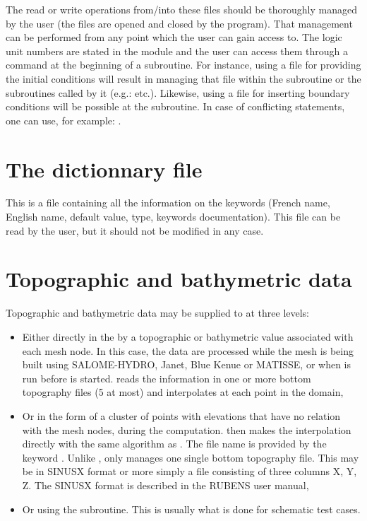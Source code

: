 The read or write operations from/into these files should be thoroughly managed
by the user (the files are opened and closed by the program). That management
can be performed from any point which the user can gain access to.
The logic unit numbers are stated in the 
module and the user can access them through a
 command at the beginning of a
subroutine. For instance, using a file for providing the initial conditions
will result in managing that file within the  subroutine
or the subroutines called by it (e.g.:  etc.).
Likewise, using a file for inserting boundary conditions will be possible at
the  subroutine.
In case of conflicting statements, one can use,
for example: .

\section{The dictionnary file}

This is a file containing all the information on the keywords (French name,
English name, default value, type, keywords documentation). This file can be
read by the user, but it should not be modified in any case.

\section{Topographic and bathymetric data}
\label{sec:topo}
Topographic and bathymetric data may be supplied to  at three
levels:

\begin{itemize}
\item Either directly in the  by a topographic
or bathymetric value associated with each mesh node.
In this case, the data are processed while the mesh is being built using
SALOME-HYDRO, Janet, Blue Kenue or MATISSE,
or when \stbtel is run before  is started.
\stbtel reads the information in one or more bottom topography files (5 at most)
and interpolates at each point in the domain,

\item Or in the form of a cluster of points with elevations that have
no relation with the mesh nodes, during the  computation.
 then makes the interpolation directly with the same algorithm as
\stbtel.
The file name is provided by the keyword .
Unlike \stbtel,  only manages one single bottom topography file.
This may be in SINUSX format or more simply a file consisting of three columns
X, Y, Z.
The SINUSX format is described in the RUBENS user manual,

\item Or using the  subroutine.
This is usually what is done for schematic test cases.
\end{itemize}

